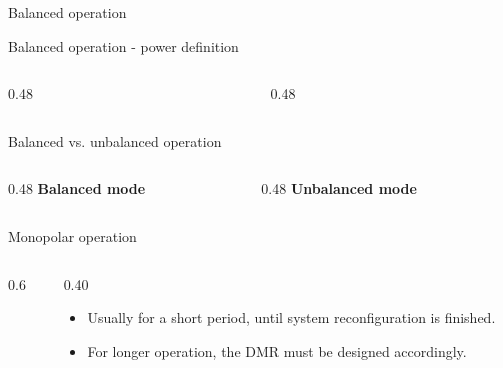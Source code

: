 \begin{frame}{Balanced operation}
  \centering
\end{frame}

\begin{frame}{Balanced operation - power definition}
  \begin{columns}[c,onlytextwidth]
    \begin{column}{0.48\textwidth}\centering
    \end{column}
    \begin{column}{0.48\textwidth}\centering
    \end{column}
  \end{columns}
\end{frame}

\begin{frame}{Balanced vs. unbalanced operation}
  \begin{columns}[c,onlytextwidth]
    \begin{column}{0.48\textwidth}\centering
      \textbf{Balanced mode}\\[0.3em]
    \end{column}
    \begin{column}{0.48\textwidth}\centering
      \textbf{Unbalanced mode}\\[0.3em]
    \end{column}
  \end{columns}
\end{frame}

\begin{frame}{Monopolar operation}
  \begin{columns}[c,onlytextwidth]
    \begin{column}{0.6\textwidth}\centering
    \end{column}
    \begin{column}{0.40\textwidth}
      \begin{itemize}
        \setlength{\itemsep}{0.4em}
        \item Usually for a short period, until system reconfiguration is
              finished.
        \item For longer operation, the DMR must be designed accordingly.
      \end{itemize}
    \end{column}
  \end{columns}
\end{frame}


